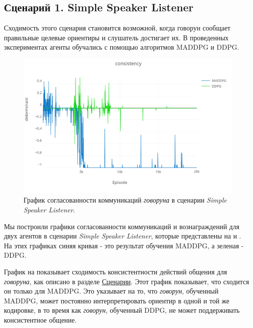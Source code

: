 \subsection{Сценарий 1. Simple Speaker Listener}

Сходимость этого сценария становится возможной, когда говорун сообщает правильные целевые ориентиры и слушатель достигает их. В проведенных экспериментах агенты обучались с помощью алгоритмов MADDPG и DDPG.

\begin{figure}[ht!]
    \center
    \includegraphics [scale=0.38] {my_folder/images/ch5/ssl-comm.png}
    \caption{График согласованности коммуникаций \textit{говоруна} в сценарии \textit{Simple Speaker Listener}.}
    \label{fig:result-ssl-comm}
\end{figure}

Мы построили графики согласованности коммуникаций и вознаграждений для двух агентов в сценарии \textit{Simple Speaker Listener}, которые представлены на  и . На этих графиках синяя кривая - это результат обучения MADDPG, а зеленая - DDPG.

График на  показывает сходимость консистентности действий общения для \textit{говоруна}, как описано в разделе \hyperref[exp-ssl]{Сценарии}. Этот график показывает, что сходится он только для MADDPG. Это указывает на то, что \textit{говорун}, обученный MADDPG, может постоянно интерпретировать ориентир в одной и той же кодировке, в то время как \textit{говорун}, обученный DDPG, не может поддерживать консистентное общение.

